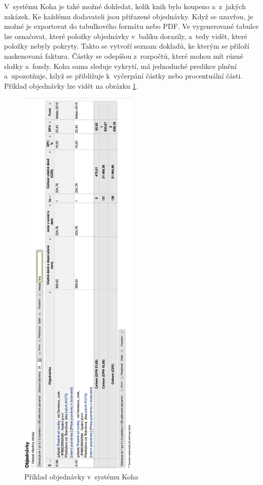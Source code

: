 \documentclass[
	11pt, oneside, printed, final, palatino, monochrome
	microtype,
	table,   %
	lof,     %
	lot     %
]{fithesis3}
\begin{document}
{V~systému Koha je také možné dohledat, kolik knih bylo koupeno a~z~jakých zakázek. Ke každému dodavateli jsou přiřazené objednávky. Když se uzavřou, je možné je exportovat do tabulkového formátu nebo PDF. Ve vygenerované tabulce lze označovat, které položky objednávky v~balíku dorazily, a~tedy vidět, které položky nebyly pokryty. Takto se vytvoří seznam dokladů, ke kterým se přiloží naskenovaná faktura. Částky se odepíšou z~rozpočtů, které mohou mít různé složky a~fondy. Koha sama sleduje vykrytí, má jednoduché predikce plnění a~upozotňuje, když se přibližuje k~vyčerpání částky nebo procentuální části. Příklad objednávky lze vidět na obrázku \ref{fig:objednavka}.

\begin{figure}
    \centering
    \includegraphics[width=0.5\textwidth]{resources/objednavka_left}
    \caption{Příklad objednávky v~systému Koha}
    \label{fig:objednavka}
\end{figure}

}
\end{document}
